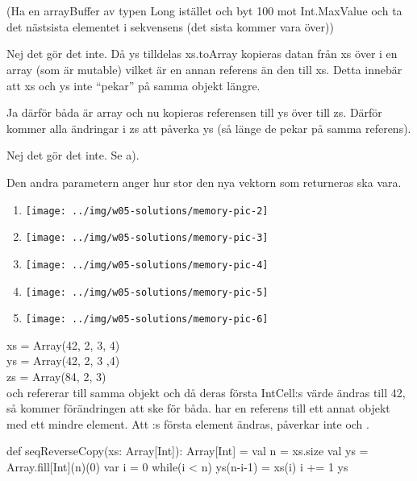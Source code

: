 \Subtask {}\\
\\
(Ha en arrayBuffer av typen Long istället och byt 100 mot Int.MaxValue och ta det nästsista elementet i sekvensens (det sista kommer vara över)) 

\Task %

\Subtask Nej det gör det inte. 
Då ys tilldelas xs.toArray kopieras datan från xs över i en array (som är mutable) vilket är en annan referens än den till xs. 
Detta innebär att xs och ys inte “pekar” på samma objekt längre.

\Subtask Ja därför båda är array och nu kopieras referensen till ys över till zs. 
Därför kommer alla ändringar i zs att påverka ys (så länge de pekar på samma referens).

\Subtask Nej det gör det inte. Se a).


\Task %

\Subtask Den andra parametern anger hur stor den nya vektorn som returneras ska vara.

\Subtask \begin{enumerate}
\item \texttt{[image: ../img/w05-solutions/memory-pic-2]}
\item \texttt{[image: ../img/w05-solutions/memory-pic-3]}
\item \texttt{[image: ../img/w05-solutions/memory-pic-4]}
\item \texttt{[image: ../img/w05-solutions/memory-pic-5]}
\item \texttt{[image: ../img/w05-solutions/memory-pic-6]}
\end{enumerate}
xs = Array(42, 2, 3, 4)\\
ys = Array(42, 2, 3 ,4)\\
zs = Array(84, 2, 3)\\
 och  refererar till samma objekt och då deras första IntCell:s värde ändras till 42, så kommer förändringen att ske för båda.
 har en referens till ett annat objekt med ett mindre element. Att :s första element ändras, påverkar inte  och .


\Task %

\Subtask \begin{Code}
def seqReverseCopy(xs: Array[Int]): Array[Int] = {
  val n = xs.size
  val ys = Array.fill[Int](n)(0)
  var i = 0
  while(i < n) {
    ys(n-i-1) = xs(i)
    i += 1
  }
  ys
}
\end{Code}

